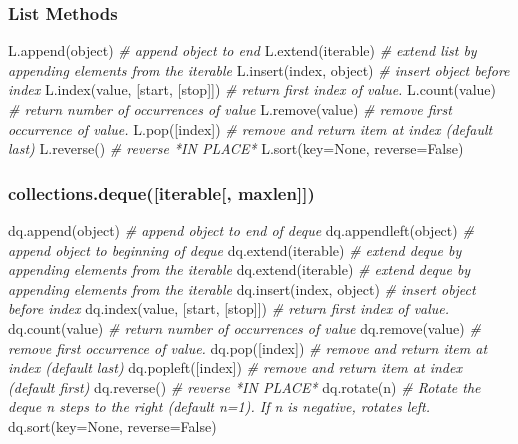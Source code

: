 \documentclass[11pt]{article}
\newenvironment{Shaded}{}{}
\newcommand{\CommentTok}[1]{\textcolor[rgb]{0.38,0.63,0.69}{\textit{{#1}}}}
\newcommand{\NormalTok}[1]{{#1}}
\newcommand{\VariableTok}[1]{\textcolor[rgb]{0.10,0.09,0.49}{{#1}}}
\newcommand{\OperatorTok}[1]{\textcolor[rgb]{0.40,0.40,0.40}{{#1}}}
\newcommand{\BuiltInTok}[1]{{#1}}
\begin{document}
\subsubsection{List Methods}\label{list-methods}

\begin{Shaded}
\begin{Highlighting}[]
\NormalTok{L.append(}\BuiltInTok{object}\NormalTok{) }\CommentTok{# append object to end}
\NormalTok{L.extend(iterable) }\CommentTok{# extend list by appending elements from the iterable}
\NormalTok{L.insert(index, }\BuiltInTok{object}\NormalTok{) }\CommentTok{# insert object before index}
\NormalTok{L.index(value, [start, [stop]]) }\CommentTok{# return first index of value.}
\NormalTok{L.count(value) }\CommentTok{# return number of occurrences of value}
\NormalTok{L.remove(value) }\CommentTok{# remove first occurrence of value.}
\NormalTok{L.pop([index]) }\CommentTok{# remove and return item at index (default last)}
\NormalTok{L.reverse() }\CommentTok{# reverse *IN PLACE*}
\NormalTok{L.sort(key}\OperatorTok{=}\VariableTok{None}\NormalTok{, reverse}\OperatorTok{=}\VariableTok{False}\NormalTok{)}
\end{Highlighting}
\end{Shaded}

\subsubsection{collections.deque({[}iterable{[},
maxlen{]}{]})}\label{collections.dequeiterable-maxlen}

\begin{Shaded}
\begin{Highlighting}[]
\NormalTok{dq.append(}\BuiltInTok{object}\NormalTok{) }\CommentTok{# append object to end of deque}
\NormalTok{dq.appendleft(}\BuiltInTok{object}\NormalTok{) }\CommentTok{# append object to beginning of deque}
\NormalTok{dq.extend(iterable) }\CommentTok{# extend deque by appending elements from the iterable}
\NormalTok{dq.extend(iterable) }\CommentTok{# extend deque by appending elements from the iterable}
\NormalTok{dq.insert(index, }\BuiltInTok{object}\NormalTok{) }\CommentTok{# insert object before index}
\NormalTok{dq.index(value, [start, [stop]]) }\CommentTok{# return first index of value.}
\NormalTok{dq.count(value) }\CommentTok{# return number of occurrences of value}
\NormalTok{dq.remove(value) }\CommentTok{# remove first occurrence of value.}
\NormalTok{dq.pop([index]) }\CommentTok{# remove and return item at index (default last)}
\NormalTok{dq.popleft([index]) }\CommentTok{# remove and return item at index (default first)}
\NormalTok{dq.reverse() }\CommentTok{# reverse *IN PLACE*}
\NormalTok{dq.rotate(n) }\CommentTok{# Rotate the deque n steps to the right (default n=1).  If n is negative, rotates left.}
\NormalTok{dq.sort(key}\OperatorTok{=}\VariableTok{None}\NormalTok{, reverse}\OperatorTok{=}\VariableTok{False}\NormalTok{)}
\end{Highlighting}
\end{Shaded}
\end{document}
